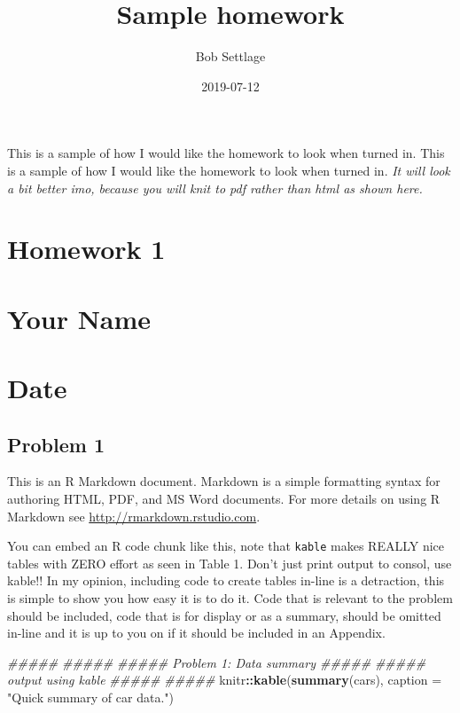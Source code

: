 \documentclass[]{article}
\title{Sample homework}
\author{Bob Settlage}
\date{2019-07-12}
\newenvironment{Shaded}{\begin{snugshade}}{\end{snugshade}}
\newcommand{\CommentTok}[1]{\textcolor[rgb]{0.56,0.35,0.01}{\textit{#1}}}
\newcommand{\DataTypeTok}[1]{\textcolor[rgb]{0.13,0.29,0.53}{#1}}
\newcommand{\KeywordTok}[1]{\textcolor[rgb]{0.13,0.29,0.53}{\textbf{#1}}}
\newcommand{\NormalTok}[1]{#1}
\newcommand{\OperatorTok}[1]{\textcolor[rgb]{0.81,0.36,0.00}{\textbf{#1}}}
\newcommand{\StringTok}[1]{\textcolor[rgb]{0.31,0.60,0.02}{#1}}
\begin{document}
\maketitle

This is a sample of how I would like the homework to look when turned
in. This is a sample of how I would like the homework to look when
turned in. \emph{It will look a bit better imo, because you will knit to
pdf rather than html as shown here.}

\hypertarget{homework-1}{%
\section{Homework 1}\label{homework-1}}

\hypertarget{your-name}{%
\section{Your Name}\label{your-name}}

\hypertarget{date}{%
\section{Date}\label{date}}

\hypertarget{problem-1}{%
\subsection{Problem 1}\label{problem-1}}

This is an R Markdown document. Markdown is a simple formatting syntax
for authoring HTML, PDF, and MS Word documents. For more details on
using R Markdown see \url{http://rmarkdown.rstudio.com}.

You can embed an R code chunk like this, note that \texttt{kable} makes
REALLY nice tables with ZERO effort as seen in Table 1. Don't just print
output to consol, use kable!! In my opinion, including code to create
tables in-line is a detraction, this is simple to show you how easy it
is to do it. Code that is relevant to the problem should be included,
code that is for display or as a summary, should be omitted in-line and
it is up to you on if it should be included in an Appendix.

\begin{Shaded}
\begin{Highlighting}[]
\CommentTok{##### }
\CommentTok{##### }
\CommentTok{##### Problem 1: Data summary #####}
\CommentTok{##### output using kable}
\CommentTok{##### }
\CommentTok{##### }
\NormalTok{knitr}\OperatorTok{::}\KeywordTok{kable}\NormalTok{(}\KeywordTok{summary}\NormalTok{(cars), }\DataTypeTok{caption =} \StringTok{"Quick summary of car data."}\NormalTok{)}
\end{Highlighting}
\end{Shaded}
\end{document}
